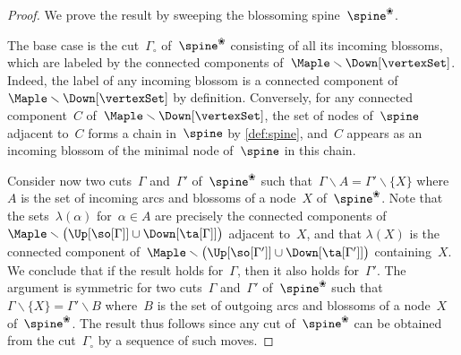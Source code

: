 \documentclass{amsart}
\theoremstyle{definition}
\newcommand{\ssm}{\smallsetminus} %
\newcommand{\blossom}{\text{\ding{96}}} %
\newcommand{\labeling}{\lambda} %
\begin{document}
\begin{proof}
  We prove the result by sweeping the blossoming spine~$\spine^\blossom$.

  The base case is the cut~$\Gamma_\circ$ of~$\spine^\blossom$ consisting of all its incoming blossoms, which are labeled by the connected components of~$\Maple \ssm \Down[\vertexSet]$.
  Indeed, the label of any incoming blossom is a connected component of~$\Maple \ssm \Down[\vertexSet]$ by definition.
  Conversely, for any connected component~$C$ of~$\Maple \ssm \Down[\vertexSet]$, the set of nodes of~$\spine$ adjacent to~$C$ forms a chain in~$\spine$ by \cref{def:spine}, and~$C$ appears as an incoming blossom of the minimal node of~$\spine$ in this chain.
  
  Consider now two cuts~$\Gamma$ and~$\Gamma'$ of~$\spine^\blossom$ such that~$\Gamma \ssm A = \Gamma' \ssm \{X\}$ where~$A$ is the set of incoming arcs and blossoms of a node~$X$ of~$\spine^\blossom$.
  Note that the sets~$\labeling(\alpha)$ for~$\alpha \in A$ are precisely the connected components of~$\Maple \ssm \big( \Up[{\so[\Gamma]}] \cup \Down[{\ta[\Gamma]}] \big)$ adjacent to~$X$, and that $\labeling(X)$ is the connected component of~$\Maple \ssm \big( \Up[{\so[\Gamma']}] \cup \Down[{\ta[\Gamma']}] \big)$ containing~$X$.
  We conclude that if the result holds for~$\Gamma$, then it also holds for~$\Gamma'$.
  The argument is symmetric for two cuts~$\Gamma$ and~$\Gamma'$ of~$\spine^\blossom$ such that~$\Gamma \ssm \{X\} = \Gamma' \ssm B$ where~$B$ is the set of outgoing arcs and blossoms of a node~$X$ of~$\spine^\blossom$.
  The result thus follows since any cut of~$\spine^\blossom$ can be obtained from the cut~$\Gamma_\circ$ by a sequence of such moves.
\end{proof}
%
\end{document}
